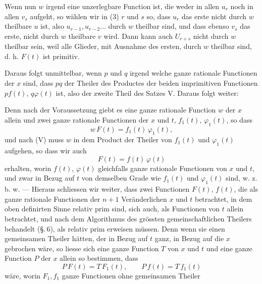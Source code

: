
Wenn nun $w$ irgend eine unzerlegbare Function ist, die
weder in allen $u_r$ noch in allen $v_s$ aufgeht, so wählen wir in (3)
$r$ und $s$ so, dass $u_r$ das erste nicht durch $w$ theilbare $u$ ist, also
$u_{r-1}, u_{r-2}\dots$ durch $w$ theilbar sind, und dass ebenso $v_s$ das
erste, nicht durch $w$ theilbare $v$ wird. Dann kann auch $U_{r+s}$
nicht durch $w$ theilbar sein, weil alle Glieder, mit Ausnahme
des ersten, durch $w$ theilbar sind, d. h. $F(t)$ ist primitiv.

Daraus folgt unmittelbar, wenn $p$ und $q$ irgend welche ganze
rationale Functionen der $x$ sind, dass $pq$ der Theiler des Productes
der beiden imprimitiven Functionen $pf(t)$, $q\varphi(t)$ ist, also
der zweite Theil des Satzes V. Daraus folgt weiter:


Denn nach der Voraussetzung giebt es eine ganze rationale
Function $w$ der $x$ allein und zwei ganze rationale Functionen
der $x$ und $t$, $f_1(t)$, $\varphi_1(t)$, so dass
\[
w\,F(t) = f_1(t)\,\varphi_1(t),
\]
und nach (V) muss $w$ in dem Product der Theiler von $f_1(t)$ und
$\varphi_1(t)$ aufgehen, so dass wir auch
\[
F(t) = f(t)\,\varphi(t)
\]
erhalten, worin $f(t)$, $\varphi(t)$ gleichfalls ganze rationale Functionen
von $x$ und $t$, und zwar in Bezug auf $t$ von demselben Grade wie
$f_1(t)$ und $\varphi_1(t)$ sind, w. z. b. w. --- Hieraus schliessen wir weiter,
dass zwei Functionen $F(t)$, $f(t)$, die als ganze rationale Functionen
der $n+1$ Veränderlichen $x$ und $t$ betrachtet, in dem oben definirten
Sinne relativ prim sind, sich auch, als Functionen von $t$
allein betrachtet, und nach dem Algorithmus des grössten gemeinschaftlichen
Theilers behandelt (\S.\,6), als relativ prim erweisen
müssen. Denn wenn sie einen gemeinsamen Theiler hätten, der in
Bezug auf $t$ ganz, in Bezug auf die $x$ gebrochen wäre, so liesse
sich eine ganze Function $T$ von $x$ und $t$ und eine ganze Function
$P$ der $x$ allein so bestimmen, dass
\[
P\,F(t) = T\,F_1(t), \qquad P\,f(t) = T\,f_1(t)
\]
wäre, worin $F_1, f_1$ ganze Functionen ohne gemeinsamen Theiler
